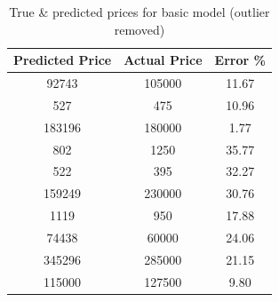 \documentclass[12pt,twoside]{report}
\begin{document}
\begin{table}[!htbp]
	\centering
	\caption{True \& predicted prices for basic model (outlier removed)}
	\label{basic_model_prediction_price_outlier_removed}
	\begin{tabular}{| c | c | c |}
		\hline
		Predicted Price & Actual Price & Error \% \\
		\hline
		92743 & 105000 & 11.67 \\
		\hline
		527 & 475 & 10.96 \\
		\hline
		183196 & 180000 & 1.77\\
		\hline
		802 & 1250 & 35.77 \\
		\hline
		522 & 395 & 32.27 \\
		\hline
		159249 & 230000 & 30.76 \\
		\hline
		1119 & 950 & 17.88 \\ 
		\hline
		74438 & 60000 & 24.06 \\
		\hline
		345296 & 285000 & 21.15 \\
		\hline
		115000 & 127500 & 9.80 \\
		\hline
	\end{tabular}
\end{table}
\end{document}
